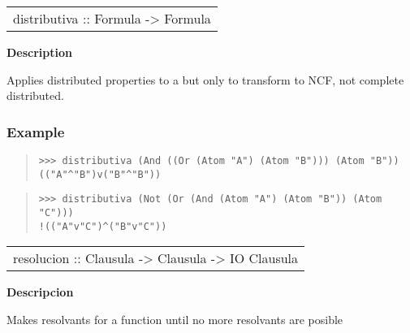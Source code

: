 \begin{haddockdesc}
\item[\begin{tabular}{@{}l}
distributiva :: Formula -> Formula
\end{tabular}]
{\haddockbegindoc
\textbf{Description}\par
Applies distributed properties to a  but only to transform to NCF, not complete distributed.\par
\subsubsection*{\textbf{Example}}
\begin{quote}
{\haddockverb\begin{verbatim}
>>> distributiva (And ((Or (Atom "A") (Atom "B"))) (Atom "B"))
(("A"^"B")v("B"^"B"))

\end{verbatim}}
\end{quote}
\begin{quote}
{\haddockverb\begin{verbatim}
>>> distributiva (Not (Or (And (Atom "A") (Atom "B")) (Atom "C")))
!(("A"v"C")^("B"v"C"))

\end{verbatim}}
\end{quote}}
\end{haddockdesc}
\begin{haddockdesc}
\item[\begin{tabular}{@{}l}
resolucion :: {\char 91}Clausula{\char 93} -> Clausula -> IO Clausula
\end{tabular}]
{\haddockbegindoc
\textbf{Descripcion}\par
Makes resolvants for a function until no more resolvants are posible\par}
\end{haddockdesc}
